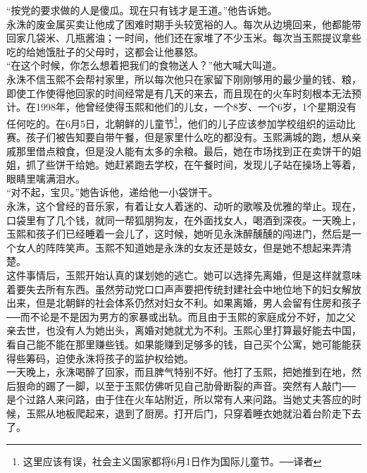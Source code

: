 “按党的要求做的人是傻瓜。现在只有钱才是王道。”他告诉她。\\

永洙的废金属买卖让他成了困难时期手头较宽裕的人。每次从边境回来，他都能带回家几袋米、几瓶酱油；一时间，他们还在家堆了不少玉米。每次当玉熙提议拿些吃的给她饿肚子的父母时，这都会让他暴怒。\\

“在这个时候，你怎么想着把我们的食物送人？”他大喊大叫道。\\

永洙不信玉熙不会帮衬家里，所以每次他只在家留下刚刚够用的最少量的钱、粮，即使工作使得他回家的时间经常是有几天的来去，而且现在的火车时刻根本无法预计。在1998年，他曾经使得玉熙和他们的儿女，一个8岁、一个6岁，1个星期没有任何吃的。在6月5日，北朝鲜的儿童节\footnote{这里应该有误，社会主义国家都将6月1日作为国际儿童节。──译者}，他们的儿子应该参加学校组织的运动比赛。孩子们被告知要自带午餐，但是家里什么吃的都没有。玉熙满城的跑，想从亲戚那里借点粮食，但是没人能有太多的余粮。最后，她在市场找到正在卖饼干的姐姐，抓了些饼干给她。她赶紧跑去学校，在午餐时间，发现儿子站在操场上等着，眼睛里噙满泪水。\\

“对不起，宝贝。”她告诉他，递给他一小袋饼干。\\

永洙，这个曾经的音乐家，有着让女人着迷的、动听的歌喉及优雅的举止。现在，口袋里有了几个钱，就同一帮狐朋狗友，在外面找女人，喝酒到深夜。一天晚上，玉熙和孩子们已经睡着一会儿了，这时候，她听见永洙醉醺醺的闯进门，然后是一个女人的阵阵笑声。玉熙不知道她是永洙的女友还是妓女，但是她不想起来弄清楚。\\

这件事情后，玉熙开始认真的谋划她的逃亡。她可以选择先离婚，但是这样就意味着要失去所有东西。虽然劳动党口口声声要把传统封建社会中地位地下的妇女解放出来，但是北朝鲜的社会体系仍然对妇女不利。如果离婚，男人会留有住房和孩子──而不论是不是因为男方的家暴或出轨。而且由于玉熙的家庭成分不好，加之父亲去世，也没有人为她出头，离婚对她就尤为不利。玉熙心里打算最好能去中国，看自己能不能在那里赚些钱。如果能赚到足够多的钱，自己买个公寓，她可能能获得些筹码，迫使永洙将孩子的监护权给她。\\

一天晚上，永洙喝醉了回家，而且脾气特别不好。他打了玉熙，把她推到在地，然后狠命的踢了一脚，以至于玉熙仿佛听见自己肋骨断裂的声音。突然有人敲门──是个过路人来问路，由于住在火车站附近，所以常有人来问路。当她丈夫答应的时候，玉熙从地板爬起来，退到了厨房。打开后门，只穿着睡衣她就沿着台阶走下去了。\\

